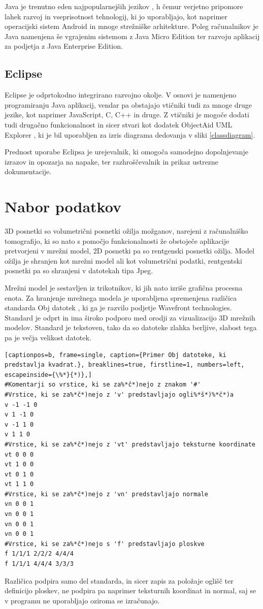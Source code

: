 \documentclass[a4paper, 12pt]{book}
\begin{document}
Java je trenutno eden najpopularnejših jezikov \cite{javapopularity}, h čemur verjetno pripomore lahek razvoj in vseprisotnost tehnologij, ki jo uporabljajo, kot naprimer operacijski sistem Android in mnoge strežniške arhitekture. Poleg računalnikov je Java namenjena še vgrajenim sistemom z Java Micro Edition ter razvoju aplikacij za podjetja z Java Enterprise Edition.

\subsection*{Eclipse}

Eclipse je odprtokodno integrirano razvojno okolje. V osnovi je namenjeno programiranju Java aplikacij, vendar pa obstajajo vtičniki tudi za mnoge druge jezike, kot naprimer JavaScript, C, C++ in druge. Z vtičniki je mogoče dodati tudi drugačno funkcionalnost in sicer stvari kot dodatek ObjectAid UML Explorer \cite{objectaid}, ki je bil uporabljen za izris diagrama dedovanja v sliki \ref{classdiagram}.

Prednost uporabe Eclipsa je urejevalnik, ki omogoča samodejno dopolnjevanje izrazov in opozarja na napake, ter razhroščevalnik in prikaz ustrezne dokumentacije. 

\section{Nabor podatkov}
3D posnetki so volumetrični posnetki ožilja možganov, narejeni z računalniško tomografijo, ki so nato s pomočjo funkcionalnosti že obstoječe aplikacije pretvorjeni v mrežni model, 2D posnetki pa so rentgenski posnetki ožilja. Model ožilja je shranjen kot mrežni model ali kot volumetrični podatki, rentgentski posnetki pa so shranjeni v datotekah tipa Jpeg\cite{jpeg}.

Mrežni model je sestavljen iz trikotnikov, ki jih nato izriše grafična procesna enota. Za hranjenje mrežnega modela je uporabljena spremenjena različica standarda Obj datotek \cite{obj}, ki ga je razvilo podjetje Wavefront technologies. Standard je odprt in ima široko podporo med orodji za vizualizacijo 3D mrežnih modelov. Standard je tekstoven, tako da so datoteke zlahka berljive, slabost tega pa je večja velikost datotek.
\renewcommand{\lstlistingname}{Datoteka}
\renewcommand{\lstlistlistingname}{Seznam datotek}
{
\footnotesize
\begin{lstlisting}[captionpos=b, frame=single, caption={Primer Obj datoteke, ki predstavlja kvadrat.}, breaklines=true, firstline=1, numbers=left, escapeinside={\%*}{*)},]
#Komentarji so vrstice, ki se za%*č*)nejo z znakom '#'
#Vrstice, ki se za%*č*)nejo z 'v' predstavljajo ogli%*š*)%*č*)a 
v -1 -1 0
v 1 -1 0
v -1 1 0
v 1 1 0
#Vrstice, ki se za%*č*)nejo z 'vt' predstavljajo teksturne koordinate
vt 0 0 0
vt 1 0 0
vt 0 1 0
vt 1 1 0
#Vrstice, ki se za%*č*)nejo z 'vn' predstavljajo normale
vn 0 0 1
vn 0 0 1
vn 0 0 1
vn 0 0 1
#Vrstice, ki se za%*č*)nejo s 'f' predstavljajo ploskve
f 1/1/1 2/2/2 4/4/4
f 1/1/1 4/4/4 3/3/3
\end{lstlisting}}
Različica podpira samo del standarda, in sicer zapis za položaje oglišč ter definicijo ploskev, ne podpira pa naprimer teksturnih koordinat in normal, saj se v programu ne uporabljajo oziroma se izračunajo.
\end{document}
